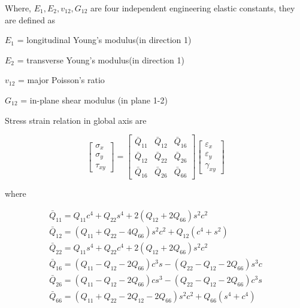 \documentclass[smallextended]{svjour3}       %
\begin{document}
Where, $E_1, E_2, v_{12}, G_{12}$ are four independent engineering elastic constants, they are
defined as 
\vspace{3mm}

$E_1$ = longitudinal Young's modulus(in direction 1)

$E_2$ = transverse  Young's modulus(in direction 1)

$v_{12}$ = major Poisson's ratio

$G_{12}$ = in-plane shear modulus (in plane 1-2)
\vspace{3mm}

Stress strain relation in global axis are

\begin{equation}
	\left[\begin{array}{l}\sigma_{x} \\ \sigma_{y} \\ \tau_{x
			y}\end{array}\right]=\left[\begin{array}{lll}\bar{Q}_{11} & \bar{Q}_{12} & \bar{Q}_{16}
			\\ \bar{Q}_{12} & \bar{Q}_{22} & \bar{Q}_{26} \\ \bar{Q}_{16} & \bar{Q}_{26} &
			\bar{Q}_{66}\end{array}\right]\left[\begin{array}{l}\varepsilon_{x} \\ \varepsilon_{y}
	\\ \gamma_{x y}\end{array}\right]
\end{equation}

where

\begin{equation}
	\begin{array}{l}
		\bar{Q}_{11}=Q_{11} c^{4}+Q_{22} s^{4}+2\left(Q_{12}+2 Q_{66}\right) s^{2} c^{2}
		\\ 
		\bar{Q}_{12}=\left(Q_{11}+Q_{22}-4 Q_{66}\right) s^{2} c^{2}+Q_{12}\left(c^{4}+s^{2}\right)
		\\ 
		\bar{Q}_{22}=Q_{11} s^{4}+Q_{22} c^{4}+2\left(Q_{12}+2 Q_{66}\right) s^{2} c^{2} \\

		\bar{Q}_{16}=\left(Q_{11}-Q_{12}-2 Q_{66}\right) c^{3} s-\left(Q_{22}-Q_{12}-2
			Q_{66}\right) s^{3} c \\ 
		\bar{Q}_{26}=\left(Q_{11}-Q_{12}-2 Q_{66}\right) c s^{3}-\left(Q_{22}-Q_{12}-2 Q_{66}\right)
		c^{3} s \\ 
		\bar{Q}_{66}=\left(Q_{11}+Q_{22}-2 Q_{12}-2 Q_{66}\right) s^{2}
		c^{2}+Q_{66}\left(s^{4}+c^{4}\right)
	\end{array}
\end{equation}
\end{document}
